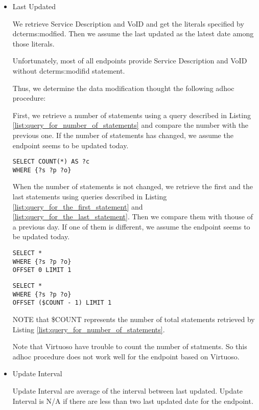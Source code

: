 \documentclass[11pt,a4paper]{article}
\begin{document}
\begin{itemize}
  \item Last Updated

  We retrieve Service Description and VoID and get the literals specified by dcterms:modfied.
  Then we assume the last updated as the latest date among those literals.

  Unfortunately, most of all endpoints provide Service Description and VoID without dcterms:modifid statement.

  Thus, we determine the data modification thought the following adhoc procedure:

  First, we retrieve a number of statements using a query described in Listing \ref{list:query_for_number_of_statements} and compare the number with the previous one. If the number of statements has changed, we assume the endpoint seems to be updated today.

  \begin{lstlisting}[basicstyle=\ttfamily\footnotesize,breaklines=true,frame=single,caption=A query for retrieving a number of statements,label=list:query_for_number_of_statements]
SELECT COUNT(*) AS ?c
WHERE {?s ?p ?o}
  \end{lstlisting}

  When the number of statements is not changed, we retrieve the first and the last statements using queries described in Listing \ref{list:query_for_the_first_statement} and \ref{list:query_for_the_last_statement}.
  Then we compare them with thouse of a previous day. If one of them is different, we assume the endpoint seems to be updated today.

  \begin{lstlisting}[basicstyle=\ttfamily\footnotesize,breaklines=true,frame=single,caption=A query for the first statement,label=list:query_for_the_first_statement]
SELECT *
WHERE {?s ?p ?o}
OFFSET 0 LIMIT 1
  \end{lstlisting}

  \begin{lstlisting}[basicstyle=\ttfamily\footnotesize,breaklines=true,frame=single,caption=A query for the last statement,label=list:query_for_the_last_statement]
SELECT *
WHERE {?s ?p ?o}
OFFSET ($COUNT - 1) LIMIT 1
  \end{lstlisting}

  NOTE that \$COUNT represents the number of total statements retrieved by Listing \ref{list:query_for_number_of_statements}.

  Note that Virtuoso have trouble to count the number of statments. So this adhoc procedure does not work well for the endpoint based on Virtuoso.

  \item Update Interval

  Update Interval are average of the interval between last updated.
  Update Interval is N/A if there are less than two last updated date for the endpoint.

\end{itemize}
\end{document}

